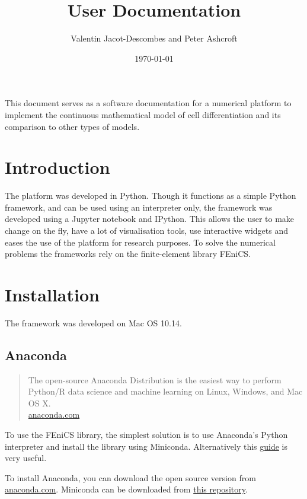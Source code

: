 \documentclass[11pt,oneside]{article}   	%
\title{User Documentation}
\author{Valentin Jacot-Descombes and Peter Ashcroft}
\date{\today}							%
\newcommand{\python}{Python\xspace}
\newcommand{\fenics}{FEniCS\xspace}
\newcommand{\jupyter}{Jupyter\xspace}
\begin{document}
\maketitle
This document serves as a software documentation for a numerical platform to implement the continuous mathematical model of cell differentiation and its comparison to other types of models.   

\tableofcontents
\newpage
\setlength{\parskip}{0.5em}

\section{Introduction}
The platform was developed in \python.
Though it functions as a simple \python framework, and can be used using an interpreter only, the framework was developed using a \jupyter notebook and I\python.
This allows the user to make change on the fly, have a lot of visualisation tools, use interactive widgets and eases the use of the platform for research purposes.
To solve the numerical problems the frameworks rely on the finite-element library \fenics.

\section{Installation}
The framework was developed on {Mac OS 10.14}.

\subsection{Anaconda}
\begin{quote}
The open-source Anaconda Distribution is the easiest way to perform \python/R data science and machine learning on Linux, Windows, and Mac OS X. \\\null\hfill\href{https://www.anaconda.com}{anaconda.com}
\end{quote}

To use the \fenics library, the simplest solution is to use Anaconda's \python interpreter and install the library using Miniconda. 
Alternatively this \href{https://klasmodin.wordpress.com/2017/09/28/fenics-using-conda/}{guide} is very useful.

To install Anaconda, you can download the open source version from \href{https://www.anaconda.com}{anaconda.com}.
Miniconda can be downloaded from \href{{https://repo.continuum.io/miniconda}}{this repository}.
\end{document}
